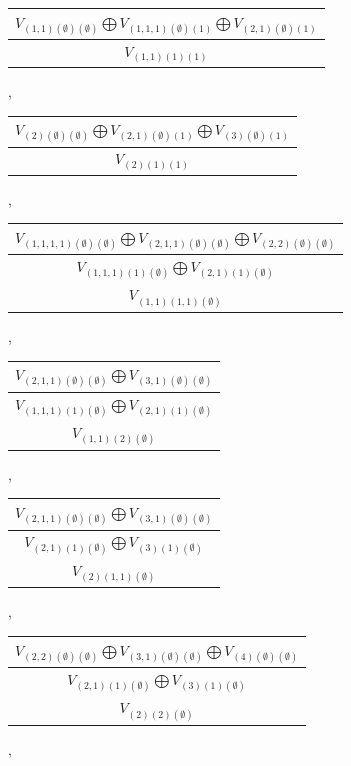 \documentclass[letterpaper,11pt]{article}
\begin{document}
	\newline 
	\begin{tabular}{| c |}
		\hline
		$V_{(1,1)(\emptyset)(\emptyset)}$$\bigoplus$$V_{(1,1,1)(\emptyset)(1)}$$\bigoplus$$V_{(2,1)(\emptyset)(1)}$\\
		\hline
		$V_{(1,1)(1)(1)}$\\
		\hline
	\end{tabular}, 
	\begin{tabular}{| c |}
		\hline
		$V_{(2)(\emptyset)(\emptyset)}$$\bigoplus$$V_{(2,1)(\emptyset)(1)}$$\bigoplus$$V_{(3)(\emptyset)(1)}$\\
		\hline
		$V_{(2)(1)(1)}$\\
		\hline
	\end{tabular}, 
	\newline 
	\begin{tabular}{| c |}
		\hline
		$V_{(1,1,1,1)(\emptyset)(\emptyset)}$$\bigoplus$$V_{(2,1,1)(\emptyset)(\emptyset)}$$\bigoplus$$V_{(2,2)(\emptyset)(\emptyset)}$\\
		\hline
		$V_{(1,1,1)(1)(\emptyset)}$$\bigoplus$$V_{(2,1)(1)(\emptyset)}$\\
		\hline
		$V_{(1,1)(1,1)(\emptyset)}$\\
		\hline
	\end{tabular}, 
	\begin{tabular}{| c |}
		\hline
		$V_{(2,1,1)(\emptyset)(\emptyset)}$$\bigoplus$$V_{(3,1)(\emptyset)(\emptyset)}$\\
		\hline
		$V_{(1,1,1)(1)(\emptyset)}$$\bigoplus$$V_{(2,1)(1)(\emptyset)}$\\
		\hline
		$V_{(1,1)(2)(\emptyset)}$\\
		\hline
	\end{tabular}, 
	\begin{tabular}{| c |}
		\hline
		$V_{(2,1,1)(\emptyset)(\emptyset)}$$\bigoplus$$V_{(3,1)(\emptyset)(\emptyset)}$\\
		\hline
		$V_{(2,1)(1)(\emptyset)}$$\bigoplus$$V_{(3)(1)(\emptyset)}$\\
		\hline
		$V_{(2)(1,1)(\emptyset)}$\\
		\hline
	\end{tabular}, 
	\newline 
	\begin{tabular}{| c |}
		\hline
		$V_{(2,2)(\emptyset)(\emptyset)}$$\bigoplus$$V_{(3,1)(\emptyset)(\emptyset)}$$\bigoplus$$V_{(4)(\emptyset)(\emptyset)}$\\
		\hline
		$V_{(2,1)(1)(\emptyset)}$$\bigoplus$$V_{(3)(1)(\emptyset)}$\\
		\hline
		$V_{(2)(2)(\emptyset)}$\\
		\hline
	\end{tabular}, 
\end{document}
